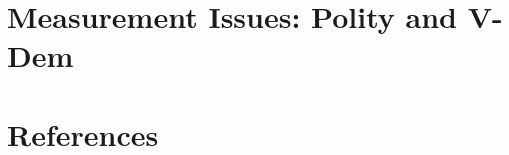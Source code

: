 \documentclass [11pt]{article}
\begin{document}
\section*{Measurement Issues: Polity and V-Dem}








































\section*{References} 

\begin{hangparas}{1cm}{1}

\end{hangparas}
\end{document}
